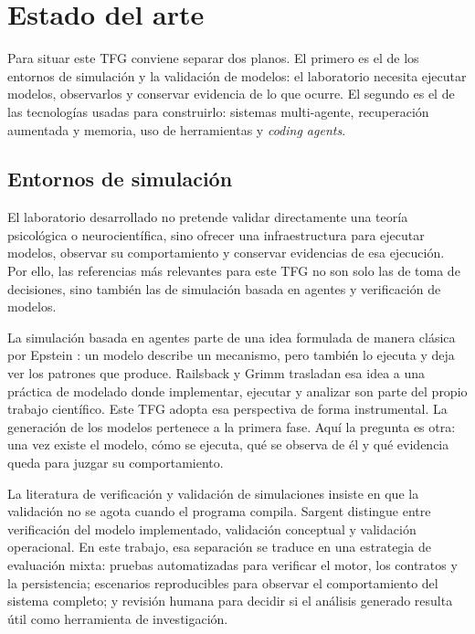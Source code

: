 \section{Estado del arte}

Para situar este TFG conviene separar dos planos. El primero es el de
los entornos de simulación y la validación de modelos: el laboratorio necesita
ejecutar modelos, observarlos y conservar evidencia de lo que ocurre. El segundo
es el de las tecnologías usadas para construirlo: sistemas multi-agente,
recuperación aumentada y memoria, uso de herramientas y \textit{coding agents}.

\subsection{Entornos de simulación}

El laboratorio desarrollado no pretende validar directamente una teoría
psicológica o neurocientífica, sino ofrecer una infraestructura para
ejecutar modelos, observar su comportamiento y conservar evidencias de esa
ejecución. Por ello, las referencias más relevantes para este TFG no son
solo las de toma de decisiones, sino también las de simulación basada en
agentes y verificación de modelos.

La simulación basada en agentes parte de una idea formulada de manera clásica
por Epstein \cite{epstein1999abm}: un modelo describe un mecanismo, pero
también lo ejecuta y deja ver los patrones que produce.
Railsback y Grimm \cite{railsback2019abm} trasladan esa idea a una práctica de
modelado donde implementar, ejecutar y analizar son parte del propio trabajo
científico. Este TFG adopta esa perspectiva de forma instrumental. La
generación de los modelos pertenece a la primera fase. Aquí la pregunta es otra:
una vez existe el modelo, cómo se ejecuta, qué se observa de él y qué evidencia
queda para juzgar su comportamiento.

La literatura de verificación y validación de simulaciones insiste en
que la validación no se agota cuando el programa compila. Sargent
\cite{sargent2013vv} distingue entre verificación del modelo implementado,
validación conceptual y validación operacional. En este trabajo, esa
separación se traduce en una estrategia de evaluación mixta: pruebas
automatizadas para verificar el motor, los contratos y la persistencia;
escenarios reproducibles para observar el comportamiento del sistema completo;
y revisión humana para decidir si el análisis generado resulta útil como
herramienta de investigación.

